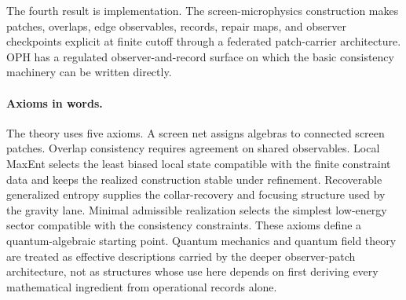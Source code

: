 \documentclass[11pt]{article}
\begin{document}
The fourth result is implementation. The screen-microphysics construction makes patches,
overlaps, edge observables, records, repair maps, and observer checkpoints explicit at finite
cutoff through a federated patch-carrier architecture. OPH has a regulated observer-and-record surface on which the basic consistency
machinery can be written directly.

\paragraph{Axioms in words.}
The theory uses five axioms. A screen net assigns algebras to connected screen patches. Overlap
consistency requires agreement on shared observables. Local MaxEnt selects the least biased local
state compatible with the finite constraint data and keeps the realized construction stable under
refinement. Recoverable generalized entropy supplies the collar-recovery and focusing structure
used by the gravity lane. Minimal admissible realization selects the simplest low-energy sector
compatible with the consistency constraints. These axioms define a quantum-algebraic
starting point. Quantum mechanics and quantum field theory are treated as effective descriptions
carried by the deeper observer-patch architecture, not as structures whose use here depends on
first deriving every mathematical ingredient from operational records alone.
\end{document}
